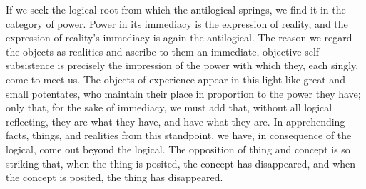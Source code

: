 \documentclass[12pt]{article}
\begin{document}
If we seek the logical root from which the antilogical springs, we find it
in the category of power. Power in its immediacy is the expression of
reality, and the expression of reality's immediacy is again the antilogical.
The reason we regard the objects as realities and ascribe to them an
immediate, objective self-subsistence is precisely the impression of the
power with which they, each singly, come to meet us. The objects of
experience appear in this light like great and small potentates, who
maintain their place in proportion to the power they have; only that, for
the sake of immediacy, we must add that, without all logical reflecting,
they are what they have, and have what they are. In apprehending facts,
things, and realities from this standpoint, we have, in consequence of the
logical, come out beyond the logical. The opposition of thing and concept is
so striking that, when the thing is posited, the concept has disappeared,
and when the concept is posited, the thing has disappeared.
\end{document}
